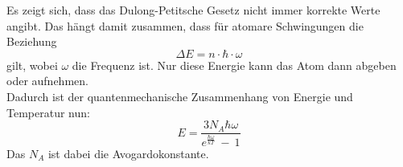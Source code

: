 Es zeigt sich, dass das Dulong-Petitsche Gesetz nicht immer korrekte Werte angibt.
Das hängt damit zusammen, dass für atomare Schwingungen die Beziehung
\begin{equation}
    \Delta E = n\cdot \hbar \cdot \omega
\end{equation}
gilt, wobei $\omega$ die Frequenz ist. Nur diese Energie kann das Atom dann abgeben oder aufnehmen.\\
Dadurch ist der quantenmechanische Zusammenhang von Energie und Temperatur nun:
\begin{equation}
    E = \frac{3N_A\hbar \omega}{e^{\frac{\hbar \omega}{kT}}\ -\ 1}
\end{equation}
Das $N_A$ ist dabei die Avogardokonstante.